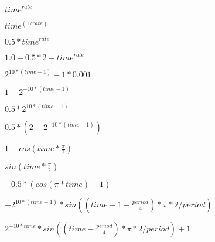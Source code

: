 \documentclass{article}
\begin{document}
${ time }^{ rate }$
\pagebreak

${ time }^ { (1/rate) }$
\pagebreak

$0.5*{ time }^{ rate }$
\pagebreak

$1.0-0.5*{ 2-time }^{ rate }$
\pagebreak

${ 2 }^{ 10*(time-1) }-1*0.001$
\pagebreak

$1-{ 2 }^{ -10*(time-1) }$
\pagebreak

$0.5*{ 2 }^{ 10*(time-1) }$
\pagebreak

$0.5*(2-{ 2 }^{ -10*(time-1) })$
\pagebreak

$1-cos(time*\frac { \pi }{ 2 } )$
\pagebreak

$sin(time*\frac { \pi }{ 2 } )$
\pagebreak

$-0.5*(cos(\pi *time)-1)$
\pagebreak

$-{ 2 }^{ 10*(time-1) }*sin((time-1-\frac { period }{ 4 } )*\pi *2/period)$
\pagebreak

${ 2 }^{ -10*time }*sin((time-\frac { period }{ 4 } )*\pi *2/period)+1$
\pagebreak
\end{document}
